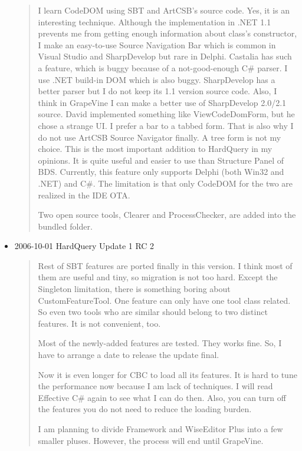 \begin{itemize}
\begin{quotation}
    I learn CodeDOM using SBT and ArtCSB's source code. Yes, it is an
    interesting technique. Although the implementation in .NET 1.1 prevents me
    from getting enough information about class's constructor, I make an
    easy-to-use Source Navigation Bar which is common in Visual Studio and
    SharpDevelop but rare in Delphi. Castalia has such a feature, which is
    buggy because of a not-good-enough C\# parser. I use .NET build-in DOM
    which is also buggy. SharpDevelop has a better parser but I do not keep its
    1.1 version source code. Also, I think in GrapeVine I can make a better use
    of SharpDevelop 2.0/2.1 source. David implemented something like
    ViewCodeDomForm, but he chose a strange UI. I prefer a bar to a tabbed
    form. That is also why I do not use ArtCSB Source Navigator finally. A tree
    form is not my choice. This is the most important addition to HardQuery in
    my opinions. It is quite useful and easier to use than Structure Panel of
    BDS. Currently, this feature only supports Delphi (both Win32 and .NET) and
    C\#. The limitation is that only CodeDOM for the two are realized in the
    IDE OTA.

    Two open source tools, Clearer and ProcessChecker, are added into the
    bundled folder.
  \end{quotation}
  \item 2006-10-01 HardQuery Update 1 RC 2
  \begin{quotation}
    Rest of SBT features are ported finally in this version. I think most of
    them are useful and tiny, so migration is not too hard. Except the
    Singleton limitation, there is something boring about CustomFeatureTool.
    One feature can only have one tool class related. So even two tools who are
    similar should belong to two distinct features. It is not convenient, too.

    Most of the newly-added features are tested. They works fine. So, I have to
    arrange a date to release the update final.

    Now it is even longer for CBC to load all its features. It is hard to tune
    the performance now because I am lack of techniques. I will read Effective
    C\# again to see what I can do then. Also, you can turn off the features
    you do not need to reduce the loading burden.

    I am planning to divide Framework and WiseEditor Plus into a few smaller
    pluses. However, the process will end until GrapeVine.
  \end{quotation}


\end{itemize}
